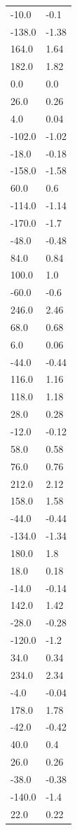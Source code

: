 \begin{longtable}{ll}
-10.0 & -0.1 \\
-138.0 & -1.38 \\
164.0 & 1.64 \\
182.0 & 1.82 \\
0.0 & 0.0 \\
26.0 & 0.26 \\
4.0 & 0.04 \\
-102.0 & -1.02 \\
-18.0 & -0.18 \\
-158.0 & -1.58 \\
60.0 & 0.6 \\
-114.0 & -1.14 \\
-170.0 & -1.7 \\
-48.0 & -0.48 \\
84.0 & 0.84 \\
100.0 & 1.0 \\
-60.0 & -0.6 \\
246.0 & 2.46 \\
68.0 & 0.68 \\
6.0 & 0.06 \\
-44.0 & -0.44 \\
116.0 & 1.16 \\
118.0 & 1.18 \\
28.0 & 0.28 \\
-12.0 & -0.12 \\
58.0 & 0.58 \\
76.0 & 0.76 \\
212.0 & 2.12 \\
158.0 & 1.58 \\
-44.0 & -0.44 \\
-134.0 & -1.34 \\
180.0 & 1.8 \\
18.0 & 0.18 \\
-14.0 & -0.14 \\
142.0 & 1.42 \\
-28.0 & -0.28 \\
-120.0 & -1.2 \\
34.0 & 0.34 \\
234.0 & 2.34 \\
-4.0 & -0.04 \\
178.0 & 1.78 \\
-42.0 & -0.42 \\
40.0 & 0.4 \\
26.0 & 0.26 \\
-38.0 & -0.38 \\
-140.0 & -1.4 \\
22.0 & 0.22 \\

\end{longtable}
